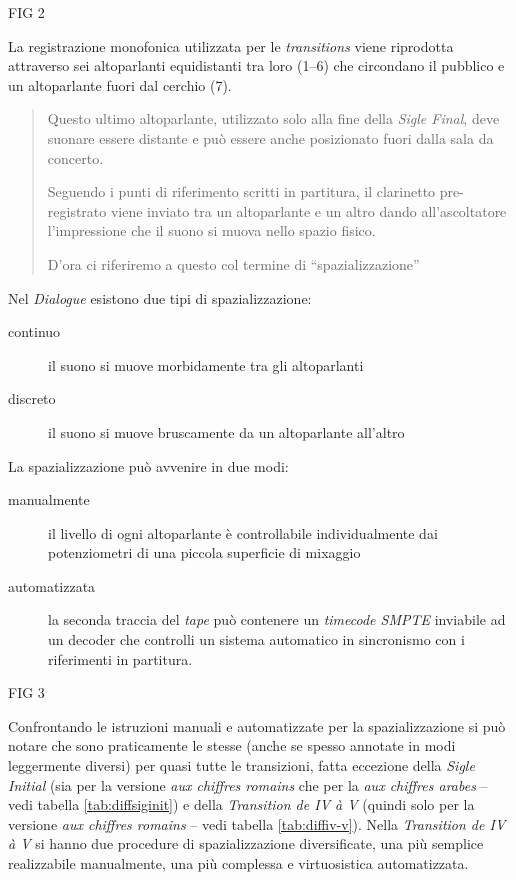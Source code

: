 FIG 2


La registrazione monofonica utilizzata per le \emph{transitions} viene riprodotta attraverso sei altoparlanti equidistanti tra loro (1--6) che circondano il pubblico e un altoparlante fuori dal cerchio (7).

\begin{quote}
{\small
Questo ultimo altoparlante, utilizzato solo alla fine della \emph{Sigle Final}, deve suonare essere distante e può essere anche posizionato fuori dalla sala da concerto.


Seguendo i punti di riferimento scritti in partitura, il clarinetto pre-registrato viene inviato tra un altoparlante e un altro dando all'ascoltatore l'impressione che il suono si muova nello spazio fisico.

D'ora ci riferiremo a questo col termine di “spazializzazione”
}

\end{quote}

Nel \emph{Dialogue} esistono due tipi di spazializzazione:

\begin{description}
\item[continuo] il suono si muove morbidamente tra gli altoparlanti
\item[discreto] il suono si muove bruscamente da un altoparlante all'altro
\end{description}

La spazializzazione può avvenire in due modi:

\begin{description}
\item[manualmente] il livello di ogni altoparlante è controllabile individualmente dai potenziometri di una piccola superficie di mixaggio
\item[automatizzata] la seconda traccia del \emph{tape} può contenere un \emph{timecode SMPTE} inviabile ad un decoder che controlli un sistema automatico in sincronismo con i riferimenti in partitura.

\end{description}

FIG 3

Confrontando le istruzioni manuali e automatizzate per la spazializzazione si può notare che sono praticamente le stesse (anche se spesso annotate in modi leggermente diversi) per quasi tutte le transizioni, fatta eccezione della \emph{Sigle Initial} (sia per la versione \emph{aux chiffres romains} che per la \emph{aux chiffres arabes} -- vedi tabella \ref{tab:diffsiginit}) e della \emph{Transition de IV à V} (quindi solo per la versione \emph{aux chiffres romains} -- vedi tabella \ref{tab:diffiv-v}). Nella \emph{Transition de IV à V} si hanno due procedure di spazializzazione diversificate, una più semplice realizzabile manualmente, una più complessa e virtuosistica automatizzata.

